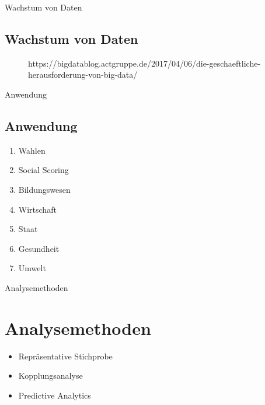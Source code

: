 \documentclass[11pt]{beamer}
\begin{document}
\begin{frame}{Wachstum von Daten}
\subsection{Wachstum von Daten}
	\begin{figure}
		\caption{https://bigdatablog.actgruppe.de/2017/04/06/die-geschaeftliche-herausforderung-von-big-data/}
	\end{figure}
\end{frame}

\begin{frame}{Anwendung}
\subsection{Anwendung}
	\begin{enumerate}
		\item Wahlen 
		\item Social Scoring
		\item Bildungswesen
		\item Wirtschaft
		\item Staat
		\item Gesundheit
		\item Umwelt
	\end{enumerate}
\end{frame}



\begin{frame}{Analysemethoden}
\section{Analysemethoden}
\begin{itemize}
\item Repräsentative Stichprobe
\item Kopplungsanalyse
\item Predictive Analytics
\end{itemize}
\end{frame}
\end{document}
